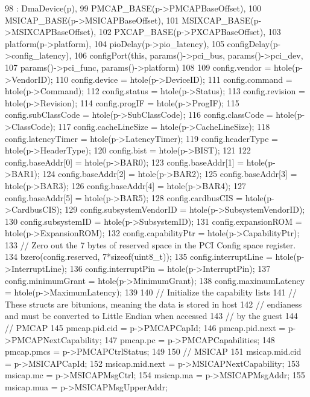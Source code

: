\begin{DoxyCode}
98     : DmaDevice(p),
99       PMCAP_BASE(p->PMCAPBaseOffset),
100       MSICAP_BASE(p->MSICAPBaseOffset),
101       MSIXCAP_BASE(p->MSIXCAPBaseOffset),
102       PXCAP_BASE(p->PXCAPBaseOffset),
103       platform(p->platform),
104       pioDelay(p->pio_latency),
105       configDelay(p->config_latency),
106       configPort(this, params()->pci_bus, params()->pci_dev,
107                  params()->pci_func, params()->platform)
108 {
109     config.vendor = htole(p->VendorID);
110     config.device = htole(p->DeviceID);
111     config.command = htole(p->Command);
112     config.status = htole(p->Status);
113     config.revision = htole(p->Revision);
114     config.progIF = htole(p->ProgIF);
115     config.subClassCode = htole(p->SubClassCode);
116     config.classCode = htole(p->ClassCode);
117     config.cacheLineSize = htole(p->CacheLineSize);
118     config.latencyTimer = htole(p->LatencyTimer);
119     config.headerType = htole(p->HeaderType);
120     config.bist = htole(p->BIST);
121 
122     config.baseAddr[0] = htole(p->BAR0);
123     config.baseAddr[1] = htole(p->BAR1);
124     config.baseAddr[2] = htole(p->BAR2);
125     config.baseAddr[3] = htole(p->BAR3);
126     config.baseAddr[4] = htole(p->BAR4);
127     config.baseAddr[5] = htole(p->BAR5);
128     config.cardbusCIS = htole(p->CardbusCIS);
129     config.subsystemVendorID = htole(p->SubsystemVendorID);
130     config.subsystemID = htole(p->SubsystemID);
131     config.expansionROM = htole(p->ExpansionROM);
132     config.capabilityPtr = htole(p->CapabilityPtr);
133     // Zero out the 7 bytes of reserved space in the PCI Config space register.
134     bzero(config.reserved, 7*sizeof(uint8_t));
135     config.interruptLine = htole(p->InterruptLine);
136     config.interruptPin = htole(p->InterruptPin);
137     config.minimumGrant = htole(p->MinimumGrant);
138     config.maximumLatency = htole(p->MaximumLatency);
139 
140     // Initialize the capability lists
141     // These structs are bitunions, meaning the data is stored in host
142     // endianess and must be converted to Little Endian when accessed
143     // by the guest
144     // PMCAP
145     pmcap.pid.cid = p->PMCAPCapId;
146     pmcap.pid.next = p->PMCAPNextCapability;
147     pmcap.pc = p->PMCAPCapabilities;
148     pmcap.pmcs = p->PMCAPCtrlStatus;
149 
150     // MSICAP
151     msicap.mid.cid = p->MSICAPCapId;
152     msicap.mid.next = p->MSICAPNextCapability;
153     msicap.mc = p->MSICAPMsgCtrl;
154     msicap.ma = p->MSICAPMsgAddr;
155     msicap.mua = p->MSICAPMsgUpperAddr;
}
\end{DoxyCode}

